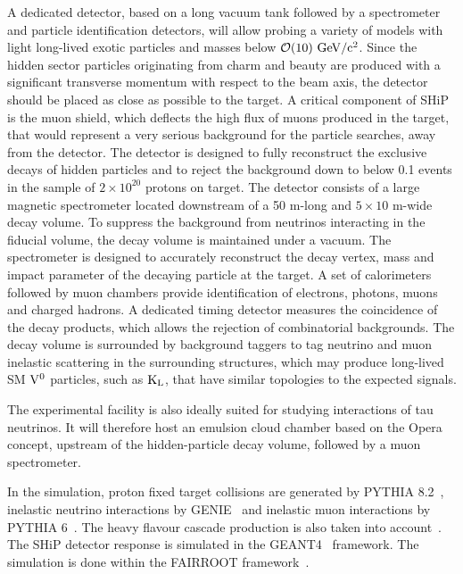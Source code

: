 \documentclass[12pt,a4paper,]{article}
\begin{document}
A dedicated detector, based on a long vacuum tank followed by a
spectrometer and particle identification detectors, will allow probing
a variety of models with light long-lived exotic particles and masses
below $\mathcal O(10)~\rm{GeV/c^2}$.  Since the hidden sector
particles originating from charm and beauty are produced with a
significant transverse momentum with respect to the beam axis, the
detector should be placed as close as possible to the target.  A
critical component of SHiP is the muon shield, which deflects the high
flux of muons produced in the target, that would represent a very
serious background for the particle searches, away from the
detector. The detector is designed to fully reconstruct the exclusive
decays of hidden particles and to reject the background down to below
0.1 events in the sample of $2\times 10^{20}$ protons on target.  The
detector consists of a large magnetic spectrometer located downstream
of a 50 m-long and $5\times 10$ m-wide decay volume. To suppress the
background from neutrinos interacting in the fiducial volume, the
decay volume is maintained under a vacuum.  The spectrometer is
designed to accurately reconstruct the decay vertex, mass and impact
parameter
of the decaying particle at 
the target. A set of calorimeters 
followed by muon 
chambers provide identification of electrons, photons, muons and charged hadrons. 
A dedicated 
 timing detector measures the coincidence of the decay products, which
allows the rejection of combinatorial backgrounds.  The decay volume
is surrounded by background taggers to tag neutrino and muon inelastic
scattering in the surrounding structures, which may produce long-lived
SM $\rm{V}^0$ particles, such as $\rm{K}_{\rm{L}}$, that have similar
topologies to the expected signals.


The experimental facility is also ideally suited for studying
interactions of tau neutrinos.  It will therefore host an emulsion
cloud chamber based on the Opera concept, upstream of the
hidden-particle decay volume, followed by a muon spectrometer.


In the simulation, proton fixed target collisions are generated by
PYTHIA 8.2~\cite{Sjostrand:2014zea}, inelastic neutrino interactions by
GENIE~\cite{Genie} and inelastic muon interactions by
PYTHIA 6~\cite{pythia6}. The heavy flavour cascade production is also
taken into account~\cite{CERN-SHiP-NOTE-2015-009}.  The SHiP detector response is
simulated in the GEANT4~\cite{Geant4} framework. The simulation is
done within the FAIRROOT framework~\cite{FAIRROOT}.
\end{document}
